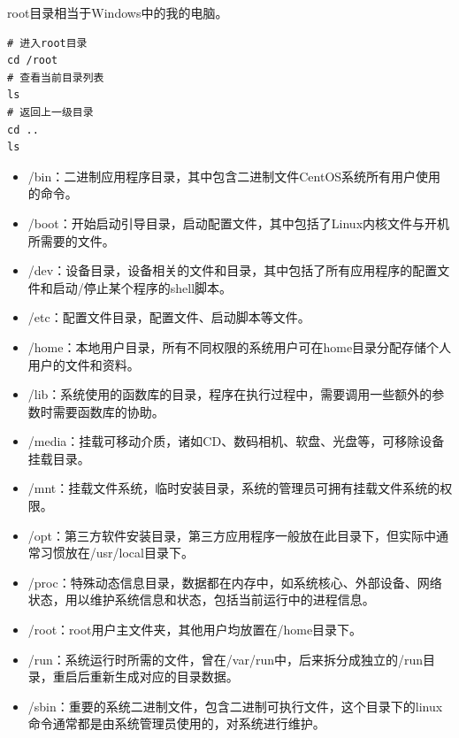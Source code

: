 \documentclass[12pt, openany, oneside]{book}
\begin{document}
root目录相当于Windows中的我的电脑。

\vspace{-0.5cm}

\begin{lstlisting}
# 进入root目录
cd /root
# 查看当前目录列表
ls
# 返回上一级目录
cd ..
ls
\end{lstlisting}

\begin{itemize}
    \item /bin：二进制应用程序目录，其中包含二进制文件CentOS系统所有用户使用的命令。

    \item /boot：开始启动引导目录，启动配置文件，其中包括了Linux内核文件与开机所需要的文件。

    \item /dev：设备目录，设备相关的文件和目录，其中包括了所有应用程序的配置文件和启动/停止某个程序的shell脚本。

    \item /etc：配置文件目录，配置文件、启动脚本等文件。

    \item /home：本地用户目录，所有不同权限的系统用户可在home目录分配存储个人用户的文件和资料。

    \item /lib：系统使用的函数库的目录，程序在执行过程中，需要调用一些额外的参数时需要函数库的协助。

    \item /media：挂载可移动介质，诸如CD、数码相机、软盘、光盘等，可移除设备挂载目录。

    \item /mnt：挂载文件系统，临时安装目录，系统的管理员可拥有挂载文件系统的权限。

    \item /opt：第三方软件安装目录，第三方应用程序一般放在此目录下，但实际中通常习惯放在/usr/local目录下。

    \item /proc：特殊动态信息目录，数据都在内存中，如系统核心、外部设备、网络状态，用以维护系统信息和状态，包括当前运行中的进程信息。

    \item /root：root用户主文件夹，其他用户均放置在/home目录下。

    \item /run：系统运行时所需的文件，曾在/var/run中，后来拆分成独立的/run目录，重启后重新生成对应的目录数据。

    \item /sbin：重要的系统二进制文件，包含二进制可执行文件，这个目录下的linux命令通常都是由系统管理员使用的，对系统进行维护。


\end{itemize}
\end{document}
